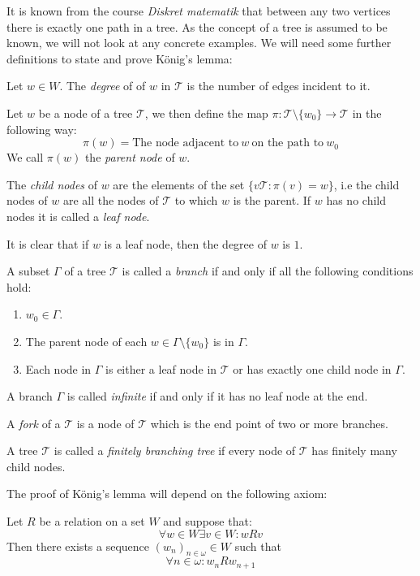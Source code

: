 \documentclass[../main.tex]{subfiles}
\begin{document}
It is known from the course \textit{Diskret matematik} that between any two
vertices there is exactly one path in a tree. 
As the concept of a tree is assumed to be known, we will not look at any concrete
examples.
We will need
some further definitions to state and prove König's lemma:
\begin{defi}
	Let $w\in W$. The \textit{degree} of of $w$ in $\mathcal{T}$ is the
	number of edges incident to it.
\end{defi}
\begin{defi}
	Let $w$ be a node of a tree $\mathcal{T}$, we then define the map
	$\pi:\mathcal{T}\setminus\{w_0\}\rightarrow\mathcal{T}$ in the
	following way:
	\[\pi(w)=\text{The node adjacent to}\ w\ \text{on the path to}\ w_0\]
	We call $\pi(w)$ the \textit{parent node} of $w$. 

	The \textit{child nodes} of $w$ are the elements of the set
	$\{v\mathcal{T}:\pi(v)=w\}$, i.e the child nodes of $w$ are all the
	nodes of $\mathcal{T}$ to which $w$ is the parent. If $w$ has no child
	nodes it is called a \textit{leaf node}.
\end{defi}
It is clear that if $w$ is a leaf node, then the degree of $w$ is $1$.
\begin{defi}
	A subset $\Gamma$ of a tree $\mathcal{T}$ is called a
	\textit{branch} if and only if all the following conditions hold:
	\begin{enumerate}
		\item $w_0\in\Gamma$.
		\item The parent node of each $w\in\Gamma\setminus\{w_0\}$ is
			in $\Gamma$.
		\item Each node in $\Gamma$ is either a leaf node in
			$\mathcal{T}$ or has exactly one child node in
			$\Gamma$.
	\end{enumerate}
	A branch $\Gamma$ is called \textit{infinite} if and only if it has no
	leaf node at the end.
\end{defi}
\begin{defi}
	A \textit{fork} of a $\mathcal{T}$ is a node of $\mathcal{T}$ which is the end
	point of two or more branches.
\end{defi}
\begin{defi}
	A tree $\mathcal{T}$ is called a \textit{finitely branching tree} if
	every node of $\mathcal{T}$ has finitely many child nodes.
\end{defi}

The proof of König's lemma will depend on the following axiom:
\begin{axiom}
	Let $R$ be a relation on a set $W$ and suppose that:
	\[\forall w\in W\exists v\in W: wRv\]
	Then there exists a sequence $(w_n)_{n\in\omega}\in W$ such that
	\[\forall n\in\omega: w_nRw_{n+1}\]
\end{axiom}
\end{document}

